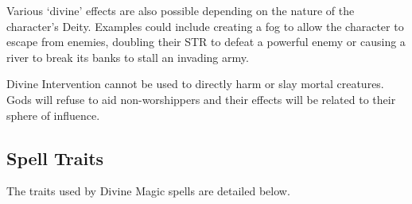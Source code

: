 Various ‘divine’ effects are also possible depending on the nature of the character’s Deity. Examples could include creating a fog to allow the character to escape from enemies, doubling their STR to defeat a powerful enemy or causing a river to break its banks to stall an invading army. 

Divine Intervention cannot be used to directly harm or slay mortal creatures. Gods will refuse to aid non-worshippers and their effects will be related to their sphere of influence. 







\subsection{Spell Traits}
The traits used by Divine Magic spells are detailed below. 

